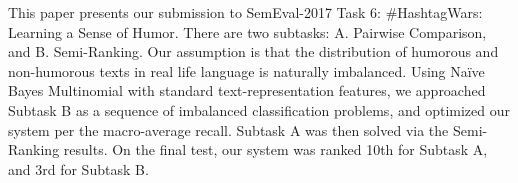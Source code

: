 This paper presents our submission to SemEval-2017 Task 6: \#HashtagWars: Learning a Sense of Humor. There are two subtasks: A. Pairwise Comparison, and B. Semi-Ranking. Our assumption is that the distribution of humorous and non-humorous texts in real life language is naturally imbalanced. Using Naïve Bayes Multinomial with standard text-representation features, we approached Subtask B as a sequence of imbalanced classification problems, and optimized our system per the macro-average recall. Subtask A was then solved via the Semi-Ranking results. On the final test, our system was ranked 10th for Subtask A, and 3rd for Subtask B.
